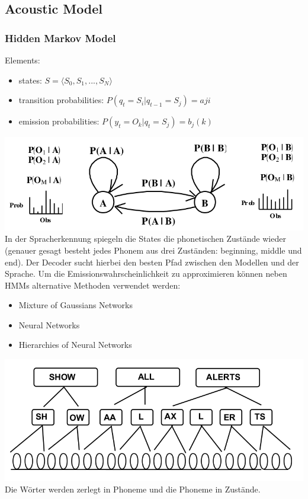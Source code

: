 \subsection{Acoustic Model}
\label{ssect:acoustic-model}

\subsubsection{Hidden Markov Model}
\label{sssect:hidden-markov-model}
Elements:
\begin{itemize}
	\item states: $S = \langle S_0, S_1, ..., S_N\rangle$
	\item transition probabilities: $P(q_t = S_i | q_{t-1} = S_j) = aji$
	\item emission probabilities: $P(y_t = O_k | q_t = S_j) = b_j(k)$
\end{itemize}
\includegraphics[scale=0.45]{hhm-example}
In der Spracherkennung spiegeln die States die phonetischen Zustände wieder (genauer gesagt besteht jedes Phonem aus drei Zuständen: beginning, middle und end). Der Decoder sucht hierbei den besten Pfad zwischen den Modellen und der Sprache.
Um die Emissionswahrscheinlichkeit zu approximieren können neben HMMs alternative Methoden verwendet werden:
\begin{itemize}
	\item Mixture of Gaussians Networks
	\item Neural Networks
	\item Hierarchies of Neural Networks
\end{itemize}

\includegraphics[scale=0.5]{alignment-phoneme-sprache}
Die Wörter werden zerlegt in Phoneme und die Phoneme in Zustände.

